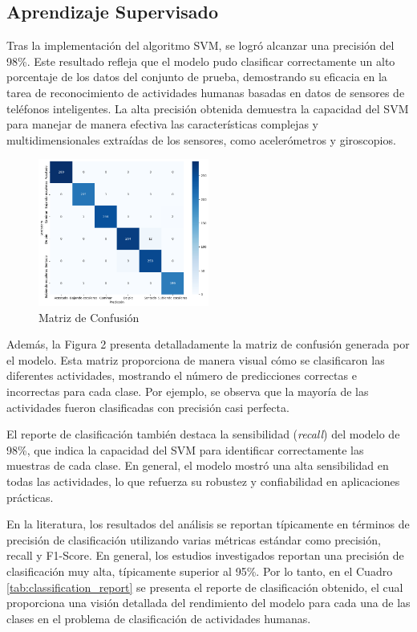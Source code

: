 \documentclass{esannV2}
\begin{document}
\subsection{Aprendizaje Supervisado}
Tras la implementación del algoritmo SVM, se logró alcanzar una precisión del 98\%. Este resultado refleja que el modelo pudo clasificar correctamente un alto porcentaje de los datos del conjunto de prueba, demostrando su eficacia en la tarea de reconocimiento de actividades humanas basadas en datos de sensores de teléfonos inteligentes. La alta precisión obtenida demuestra la capacidad del SVM para manejar de manera efectiva las características complejas y multidimensionales extraídas de los sensores, como acelerómetros y giroscopios.
\begin{figure}[ht!]
\centering
\includegraphics[width=0.5\textwidth]{figs/SVM_matriz.png}
\caption{Matriz de Confusión}\label{Fig:matriz_SVG}
\end{figure}
Además, la Figura 2 presenta detalladamente la matriz de confusión generada por el modelo. Esta matriz proporciona de manera visual cómo se clasificaron las diferentes actividades, mostrando el número de predicciones correctas e incorrectas para cada clase. Por ejemplo, se observa que la mayoría de las actividades fueron clasificadas con precisión casi perfecta.

El reporte de clasificación también destaca la sensibilidad (\textit{recall}) del modelo de 98\%, que indica la capacidad del SVM para identificar correctamente las muestras de cada clase. En general, el modelo mostró una alta sensibilidad en todas las actividades, lo que refuerza su robustez y confiabilidad en aplicaciones prácticas.

En la literatura, los resultados del análisis se reportan típicamente en términos de precisión de clasificación utilizando varias métricas estándar como precisión, recall y F1-Score. En general, los estudios investigados reportan una precisión de clasificación muy alta, típicamente superior al 95\%. Por lo tanto, en el Cuadro \ref{tab:classification_report} se presenta el reporte de clasificación obtenido, el cual proporciona una visión detallada del rendimiento del modelo para cada una de las clases en el problema de clasificación de actividades humanas.
\end{document}

